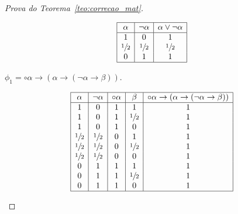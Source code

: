 \begin{proof}[Prova do Teorema~\ref{teo:correcao_mat}]
\begin{provaporcasos}
\begin{provaporsubcasos}
                    \begin{center}
                        \[
                            \begin{array}{|c|c|c|}%
                                \hline%
                                \alpha      & \neg \alpha & \alpha \lor \neg \alpha \\
                                \hline%
                                1 & 0 & 1\\
                                \meio{} & \meio{} & \meio{}\\
                                0 & 1 & 1\\
                                \hline%
                            \end{array}
                        \]
                    \end{center}
                    
                    

                    \subcasodeprova{} $\phi_{1} = \circ \alpha \to (\alpha \to (\neg \alpha \to \beta))$. 


                    \begin{center}
                        \[
                            \begin{array}{|c|c|c|c|c|}%
                                \hline%
                                \alpha      & \neg \alpha &\circ \alpha & \beta & \circ \alpha \to (\alpha \to (\neg \alpha \to \beta)) \\
                                \hline%
                                1 & 0 & 1 & 1 & 1 \\
                                1 & 0 & 1 & \meio{} & 1 \\
                                1 & 0 & 1 & 0 & 1 \\
                                \meio{} & \meio{} & 0 & 1 & 1 \\
                                \meio{} & \meio{} & 0 & \meio{} & 1 \\
                                \meio{} & \meio{} & 0 & 0 & 1 \\
                                0 & 1 & 1 & 1 & 1 \\
                                0 & 1 & 1 & \meio{} & 1 \\
                                0 & 1 & 1 & 0 & 1 \\
                                \hline%
                            \end{array}
                        \]
                    \end{center}
                    

\end{provaporsubcasos}
\end{provaporcasos}
\end{proof}
